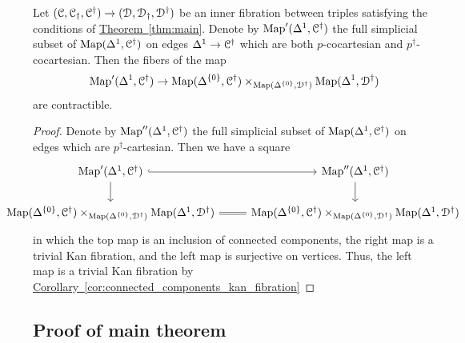 \documentclass[main.tex]{subfiles}
\begin{document}
\begin{lemma}
  \label{lemma:twice_cartesian_lifts_contractible}
  Let $(\mathcal{C}, \mathcal{C}_{\dagger}, \mathcal{C}^{\dagger}) \to (\mathcal{D}, \mathcal{D}_{\dagger}, \mathcal{D}^{\dagger})$ be an inner fibration between triples satisfying the conditions of \hyperref[thm:main]{Theorem~\ref*{thm:main}}. Denote by $\mathrm{Map}'(\Delta^{1}, \mathcal{C}^{\dagger})$ the full simplicial subset of $\mathrm{Map}(\Delta^{1}, \mathcal{C}^{\dagger})$ on edges $\Delta^{1} \to \mathcal{C}^{\dagger}$ which are both $p$-cocartesian and $p^{\dagger}$-cocartesian. Then the fibers of the map
  \begin{equation*}
    \mathrm{Map}'(\Delta^{1}, \mathcal{C}^{\dagger}) \to
    \mathrm{Map}(\Delta^{\{0\}}, \mathcal{C}^{\dagger})
    \times_{\mathrm{Map}(\Delta^{\{0\}}, \mathcal{D}^{\dagger})}
    \mathrm{Map}(\Delta^{1}, \mathcal{D}^{\dagger})
  \end{equation*}
  are contractible.
\end{lemma}
\begin{proof}
  Denote by $\mathrm{Map}''(\Delta^{1}, \mathcal{C}^{\dagger})$ the full simplicial subset of $\mathrm{Map}(\Delta^{1}, \mathcal{C}^{\dagger})$ on edges which are $p^{\dagger}$-cartesian. Then we have a square
  \begin{equation*}
    \noindent\makebox[\textwidth]{%
      \begin{tikzcd}[ampersand replacement=\&]
        \Fun'(\Delta^{1}, \category{C}^{\dagger})
        \arrow[r, hook]
        \arrow[d]
        \& \Fun''(\Delta^{1}, \category{C}^{\dagger})
        \arrow[d]
        \\
        \Fun(\Delta^{\{0\}}, \category{C}^{\dagger})
        \times_{\Fun(\Delta^{\{0\}}, \category{D}^{\dagger})}
        \Fun(\Delta^{1}, \category{D}^{\dagger})
        \arrow[r, equals]
        \& \Fun(\Delta^{\{0\}}, \category{C}^{\dagger})
        \times_{\Fun(\Delta^{\{0\}}, \category{D}^{\dagger})}
        \Fun(\Delta^{1}, \category{D}^{\dagger})
      \end{tikzcd}
    }
  \end{equation*}
  in which the top map is an inclusion of connected components, the right map is a trivial Kan fibration, and the left map is surjective on vertices. Thus, the left map is a trivial Kan fibration by \hyperref[cor:connected_components_kan_fibration]{Corollary~\ref*{cor:connected_components_kan_fibration}}
\end{proof}

\subsection{Proof of main theorem}
\end{document}
